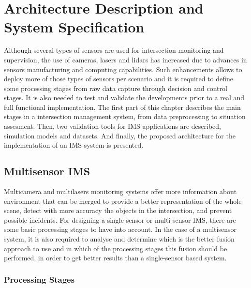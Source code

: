 
\chapter [Architecture Description and System Specification]{Architecture Description and System Specification}

Although several types of sensors are used for intersection monitoring and supervision, the use of cameras, lasers and lidars has increased due to advances in sensors manufacturing and computing capabilities. Such enhancements allows to deploy more of those types of sensors per scenario and it is required to define some processing stages from raw data capture through decision and control stages. It is also needed to test and validate the developments prior to a real and full functional implementation. The first part of this chapter describes the main stages in a intersection management system, from data preprocessing to situation assesment. Then, two validation tools for IMS applications are described, simulation models and datasets. And finally, the proposed architecture for the implementation of an IMS system is presented.

\section{Multisensor IMS}

Multicamera and multilasers monitoring systems offer more information about environment that can be merged to provide a better representation of the whole scene, detect with more accuracy the objects in the intersection, and prevent possible incidents. For designing a single-sensor or multi-sensor IMS, there are some basic processing stages to have into account. In the case of a multisensor system, it is also required to analyse and determine which is the better fusion approach to use and in which of the processing stages this fusion should be performed, in order to get better results than a single-sensor based system.

\subsection{Processing Stages}

